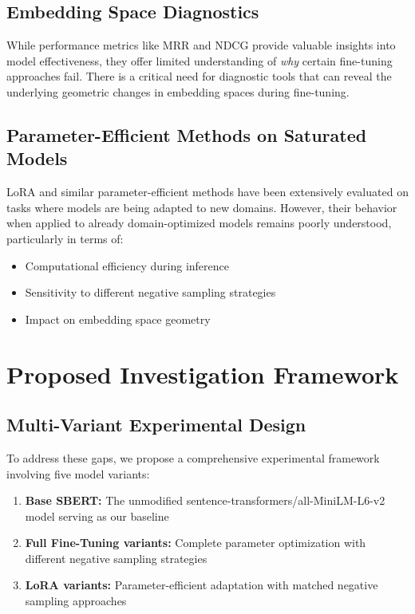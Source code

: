 \subsection{Embedding Space Diagnostics}

While performance metrics like MRR and NDCG provide valuable insights into model effectiveness, they offer limited understanding of \textit{why} certain fine-tuning approaches fail. There is a critical need for diagnostic tools that can reveal the underlying geometric changes in embedding spaces during fine-tuning.

\subsection{Parameter-Efficient Methods on Saturated Models}

LoRA and similar parameter-efficient methods have been extensively evaluated on tasks where models are being adapted to new domains. However, their behavior when applied to already domain-optimized models remains poorly understood, particularly in terms of:

\begin{itemize}
\item Computational efficiency during inference
\item Sensitivity to different negative sampling strategies
\item Impact on embedding space geometry
\end{itemize}

\section{Proposed Investigation Framework}

\subsection{Multi-Variant Experimental Design}

To address these gaps, we propose a comprehensive experimental framework involving five model variants:

\begin{enumerate}
\item \textbf{Base SBERT:} The unmodified sentence-transformers/all-MiniLM-L6-v2 model serving as our baseline
\item \textbf{Full Fine-Tuning variants:} Complete parameter optimization with different negative sampling strategies
\item \textbf{LoRA variants:} Parameter-efficient adaptation with matched negative sampling approaches
\end{enumerate}

